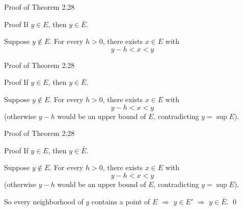 \documentclass[aspectratio=169,12pt,t]{beamer}
\begin{document}
{%
\begin{frame}{Proof of Theorem 2.28}
  \begin{proofblock}{Proof}
    If $y \in E$, then $y \in \bar{E}$.

    \vspace{0.3em}
    Suppose $y \notin E$. For every $h > 0$, there exists $x \in E$ with
    \[
      y - h < x < y
    \]
  \end{proofblock}

\end{frame}

\begin{frame}{Proof of Theorem 2.28}
  \begin{proofblock}{Proof}
    If $y \in E$, then $y \in \bar{E}$.

    \vspace{0.3em}
    Suppose $y \notin E$. For every $h > 0$, there exists $x \in E$ with
    \[
      y - h < x < y
    \]
    (otherwise $y - h$ would be an upper bound of $E$, contradicting $y = \sup E$).
  \end{proofblock}

\end{frame}

\begin{frame}{Proof of Theorem 2.28}
  \begin{proofblock}{Proof}
    If $y \in E$, then $y \in \bar{E}$.

    \vspace{0.3em}
    Suppose $y \notin E$. For every $h > 0$, there exists $x \in E$ with
    \[
      y - h < x < y
    \]
    (otherwise $y - h$ would be an upper bound of $E$, contradicting $y = \sup E$).

    \vspace{0.3em}
    So every neighborhood of $y$ contains a point of $E$ $\Rightarrow$ $y \in E'$
    $\Rightarrow$ $y \in \bar{E}$. \qed
  \end{proofblock}


\end{frame}}
\end{document}
